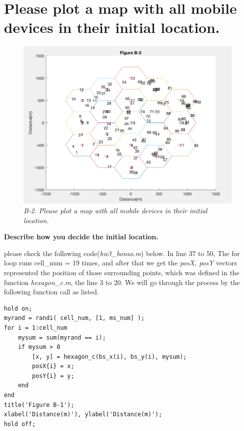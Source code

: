 \documentclass{article}
\begin{document}
\section{Please plot a map with all mobile devices in their initial location.}
\begin{figure}[h]
    \centering
    \includegraphics[width=1\textwidth]{fig2}
    \caption{\emph{B-2. Please plot a map with all mobile devices in their initial location.}}
    \label{fig:mesh2}
\end{figure}

\textbf{Describe how you decide the initial location.}

please check the following code(\emph{hw3\_bonus.m}) below. In line 37 to 50, The for loop runs cell\_num = 19 times, and after that we get the \emph{posX, posY} vectors represented the position of those surrounding points, which was defined in the function \emph{hexagon\_c.m}, the line 3 to 20. We will go through the process by the following function call as listed.
\begin{lstlisting}[caption = {hw3\_bonus.m}]
%% B-2. Please plot a map with all mobile devices in their initial location.
hold on;
myrand = randi( cell_num, [1, ms_num] );
for i = 1:cell_num
    mysum = sum(myrand == i);
    if mysum > 0
        [x, y] = hexagon_c(bs_x(i), bs_y(i), mysum);
        posX{i} = x;
        posY{i} = y;
    end
end
title('Figure B-1');
xlabel('Distance(m)'), ylabel('Distance(m)');
hold off;
\end{lstlisting}
\end{document}

